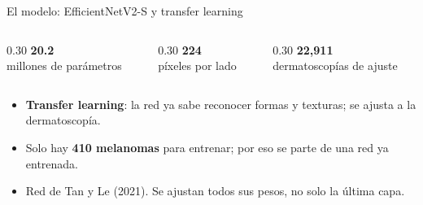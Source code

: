 \documentclass[aspectratio=169,10pt]{beamer}
\newcommand{\cifra}[1]{{\fontsize{24}{26}\selectfont\bfseries\color{azulfi}#1}}
\begin{document}
\begin{frame}{El modelo: EfficientNetV2-S y transfer learning}
  \begin{center}
  \end{center}
  \vspace{0.8em}
  \begin{columns}[c]
    \begin{column}{0.30\textwidth}\centering
      \cifra{20.2}\\ millones de parámetros
    \end{column}
    \begin{column}{0.30\textwidth}\centering
      \cifra{224}\\ píxeles por lado
    \end{column}
    \begin{column}{0.30\textwidth}\centering
      \cifra{22,911}\\ dermatoscopías de ajuste
    \end{column}
  \end{columns}
  \vspace{1.0em}
  \begin{itemize}
    \item \textbf{Transfer learning}: la red ya sabe reconocer formas y texturas; se ajusta a la dermatoscopía.
    \item Solo hay \textbf{410 melanomas} para entrenar; por eso se parte de una red ya entrenada.
    \item Red de Tan y Le (2021). Se ajustan todos sus pesos, no solo la última capa.
  \end{itemize}
\end{frame}
\end{document}

